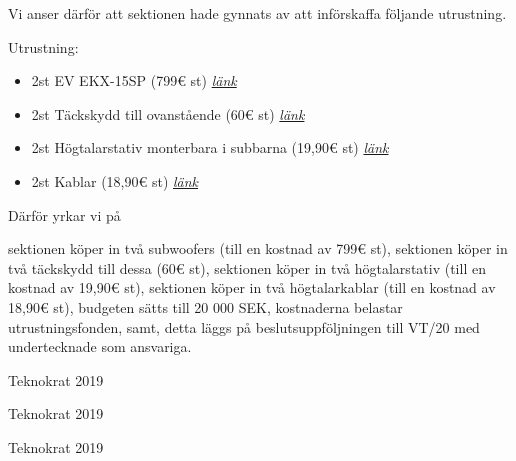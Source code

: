 \documentclass[../_main/handlingar.tex]{subfiles}
\begin{document}
    
    Vi anser därför att sektionen hade gynnats av att införskaffa följande utrustning. 
    
    Utrustning: 
    \begin{itemize}
        \item 2st EV EKX-15SP (799{\euro} st)           \href{https://www.thomann.de/se/ev_ekx_15sp.htm}{\textit{länk}}
        \item 2st Täckskydd till ovanstående (60{\euro} st)                \href{https://www.thomann.de/se/ev_ekx_15s_cvr.htm}{\textit{länk}}
        \item 2st Högtalarstativ monterbara i subbarna (19,90{\euro} st) \href{https://www.thomann.de/se/gravity_sp_2332_b_speaker_stand.htm}{\textit{länk}}
        \item 2st Kablar (18,90{\euro} st)                 \href{https://www.thomann.de/se/pro_snake_tpm_20.htm}{\textit{länk}}
    \end{itemize}

    \newpage 
    
    Därför yrkar vi på
    \begin{attsatser}
       \att sektionen köper in två subwoofers (till en kostnad av 799{\euro} st),
       \att sektionen köper in två täckskydd till dessa (60{\euro} st),
       \att sektionen köper in två högtalarstativ (till en kostnad av 19,90{\euro} st),
       \att sektionen köper in två högtalarkablar (till en kostnad av 18,90{\euro} st),
       \att budgeten sätts till 20 000 SEK,
       \att kostnaderna belastar utrustningsfonden, samt, 
       \att detta läggs på beslutsuppföljningen till VT/20 med undertecknade som ansvariga.
    \end{attsatser}

    \begin{signatures}{3}
        \isekt     
        \signature{David Karlsson}{Teknokrat 2019}
        \signature{Ludvig Lifting}{Teknokrat 2019}
        \signature{Emil P. Lundh}{Teknokrat 2019}

    \end{signatures}
\end{document}
